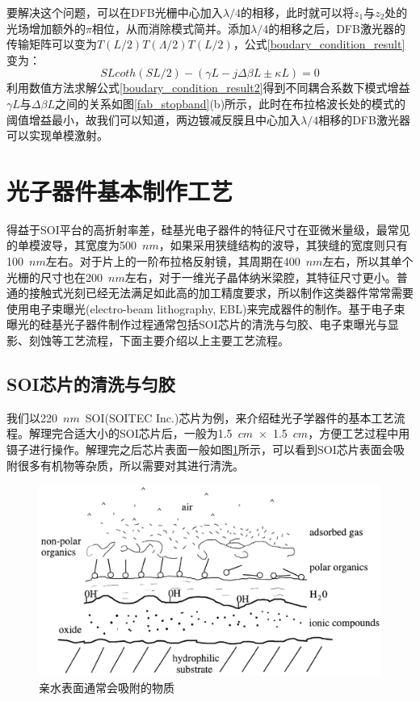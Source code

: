 要解决这个问题，可以在DFB光栅中心加入$\lambda/4$的相移，此时就可以将$z_1$与$z_2$处的光场增加额外的$\pi$相位，从而消除模式简并。添加$\lambda/4$的相移之后，DFB激光器的传输矩阵可以变为$T(L/2)T(\Lambda/2)T(L/2)$，公式\ref{boudary_condition_result}变为：
\begin{equation}
\label{boudary_condition_result2}
SLcoth(SL/2) - (\gamma L - j\Delta\beta L \pm \kappa L) = 0
\end{equation}
利用数值方法求解公式\ref{boudary_condition_result2}得到不同耦合系数下模式增益$\gamma L$与$\Delta\beta L$之间的关系如图\ref{fab_stopband}(b)所示，此时在布拉格波长处的模式的阈值增益最小，故我们可以知道，两边镀减反膜且中心加入$\lambda/4$相移的DFB激光器可以实现单模激射。



\section{光子器件基本制作工艺}
得益于SOI平台的高折射率差，硅基光电子器件的特征尺寸在亚微米量级，最常见的单模波导，其宽度为500~$nm$，如果采用狭缝结构的波导，其狭缝的宽度则只有100~$nm$左右。对于片上的一阶布拉格反射镜，其周期在400~$nm$左右，所以其单个光栅的尺寸也在200~$nm$左右，对于一维光子晶体纳米梁腔，其特征尺寸更小。普通的接触式光刻已经无法满足如此高的加工精度要求，所以制作这类器件常常需要使用电子束曝光(electro-beam lithography, EBL)来完成器件的制作。基于电子束曝光的硅基光子器件制作过程通常包括SOI芯片的清洗与匀胶、电子束曝光与显影、刻蚀等工艺流程，下面主要介绍以上主要工艺流程。

\subsection{SOI芯片的清洗与匀胶}
我们以220~$nm$~SOI(SOITEC Inc.)芯片为例，来介绍硅光子学器件的基本工艺流程。解理完合适大小的SOI芯片后，一般为1.5~$cm$~$\times$~1.5~$cm$，方便工艺过程中用镊子进行操作。解理完之后芯片表面一般如图\ref{fab_surface}所示，可以看到SOI芯片表面会吸附很多有机物等杂质，所以需要对其进行清洗。
\begin{figure}[htb]
	\centering
	\includegraphics[width=14cm]{./Pictures/fab_surface.jpg}
	\captionsetup{justification=centering}
	\caption{亲水表面通常会吸附的物质\cite{plossl1999wafer}}
	\label{fab_surface}
\end{figure}

